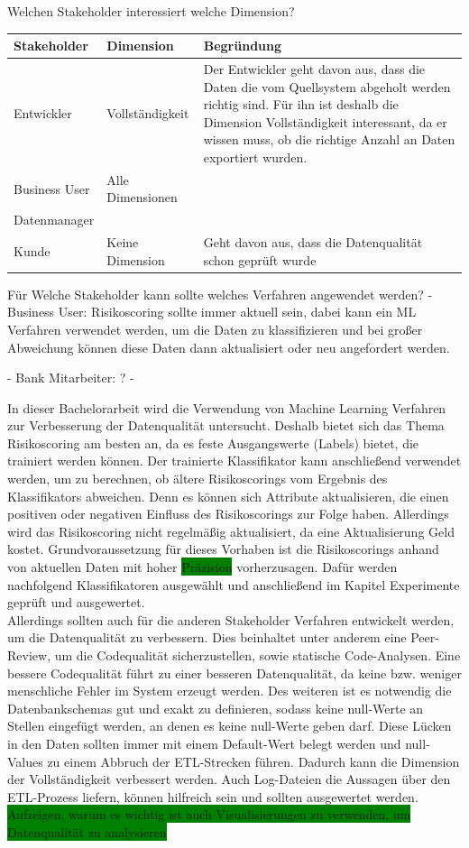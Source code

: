 Welchen Stakeholder interessiert welche Dimension?

\begin{tabular}[h]{l|l|l}
Stakeholder & Dimension & Begründung \\ \hline
Entwickler & Vollständigkeit & Der Entwickler geht davon aus, dass die Daten die vom Quellsystem abgeholt werden richtig sind. Für ihn ist deshalb die Dimension Vollständigkeit interessant, da er wissen muss, ob die richtige Anzahl an Daten exportiert wurden. \\ \hline
Business User & Alle Dimensionen & \\ \hline
Datenmanager & & \\ \hline
Kunde & Keine Dimension & Geht davon aus, dass die Datenqualität schon geprüft wurde \\
\end{tabular}


Für Welche Stakeholder kann sollte welches Verfahren angewendet werden?
- Business User: Risikoscoring sollte immer aktuell sein, dabei kann ein ML Verfahren verwendet werden, um die Daten zu klassifizieren und bei großer Abweichung können diese Daten dann aktualisiert oder neu angefordert werden.

- Bank Mitarbeiter: ?
- 

In dieser Bachelorarbeit wird die Verwendung von Machine Learning Verfahren zur Verbesserung der Datenqualität untersucht.
Deshalb bietet sich das Thema Risikoscoring am besten an, da es feste Ausgangswerte (Labels) bietet, die trainiert werden können.
Der trainierte Klassifikator kann anschließend verwendet werden, um zu berechnen, ob ältere Risikoscorings vom Ergebnis des Klassifikators abweichen.
Denn es können sich Attribute aktualisieren, die einen positiven oder negativen Einfluss des Risikoscorings zur Folge haben. 
Allerdings wird das Risikoscoring nicht regelmäßig aktualisiert, da eine Aktualisierung Geld kostet.
Grundvoraussetzung für dieses Vorhaben ist die Risikoscorings anhand von aktuellen Daten mit hoher \colorbox{green}{Präzision} vorherzusagen. 
Dafür werden nachfolgend Klassifikatoren ausgewählt und anschließend im Kapitel Experimente geprüft und ausgewertet.\\
Allerdings sollten auch für die anderen Stakeholder Verfahren entwickelt werden, um die Datenqualität zu verbessern.
Dies beinhaltet unter anderem eine Peer-Review, um die Codequalität sicherzustellen, sowie statische Code-Analysen.
Eine bessere Codequalität führt zu einer besseren Datenqualität, da keine bzw. weniger menschliche Fehler im System erzeugt werden.
Des weiteren ist es notwendig die Datenbankschemas gut und exakt zu definieren, sodass keine null-Werte an Stellen eingefügt werden, an denen es keine null-Werte geben darf.
Diese Lücken in den Daten sollten immer mit einem Default-Wert belegt werden und null-Values zu einem Abbruch der ETL-Strecken führen.
Dadurch kann die Dimension der Vollständigkeit verbessert werden.
Auch Log-Dateien die Aussagen über den ETL-Prozess liefern, können hilfreich sein und sollten ausgewertet werden.
\colorbox{green}{Aufzeigen, warum es wichtig ist auch Visualisierungen zu verwenden, um Datenqualität zu analysieren}



